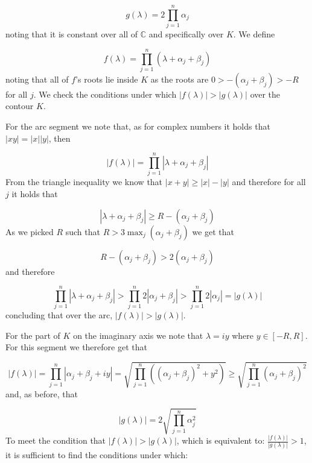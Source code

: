   \begin{equation*}
      g(\lambda)=2\prod_{j=1}^n\alpha_j
  \end{equation*}
  noting that it is constant over all of $\mathbb{C}$ and specifically over $K$.
  We define

  \begin{equation*}
      f(\lambda)=\prod_{j=1}^n(\lambda+\alpha_j+\beta_j)
  \end{equation*}
  noting that all of $f$'s roots lie inside $K$ as the roots are $0>-(\alpha_j+\beta_j)>-R$ for all $j$.
  We check the conditions under which $|f(\lambda)|>|g(\lambda)|$ over the contour $K$.

  For the arc segment we note that, as for complex numbers it holds that $|xy|=|x||y|$, then

  \begin{equation*}
      |f(\lambda)|=\prod_{j=1}^n|\lambda+\alpha_j+\beta_j|
  \end{equation*}
  From the triangle inequality we know that $|x+y| \geq |x|-|y|$ and therefore for all $j$ it holds that

  \begin{equation*}
      |\lambda+\alpha_j+\beta_j| \geq R-(\alpha_j+\beta_j)
  \end{equation*}
  As we picked $R$ such that $R>3\max_j(\alpha_j+\beta_j)$ we get that

  \begin{equation*}
      R-(\alpha_j+\beta_j)>2(\alpha_j+\beta_j)
  \end{equation*}
  and therefore

  \begin{equation*}
      \prod_{j=1}^n|\lambda+\alpha_j+\beta_j|>\prod_{j=1}^n2|\alpha_j+\beta_j|>\prod_{j=1}^n2|\alpha_j| = |g(\lambda)|
  \end{equation*}
  concluding that over the arc, $|f(\lambda)|>|g(\lambda)|$.

  For the part of $K$ on the imaginary axis we note that $\lambda=iy$ where $y\in[-R,R]$.
For this segment we therefore get that

\begin{equation*}
    |f(\lambda)|=\prod_{j=1}^n|\alpha_j+\beta_j+iy|=\sqrt{\prod_{j=1}^n((\alpha_j+\beta_j)^2+y^2)} \geq \sqrt{\prod_{j=1}^n(\alpha_j+\beta_j)^2}
 \end{equation*}
 and, as before, that

 \begin{equation*}
     |g(\lambda)|=2\sqrt{\prod_{j=1}^n\alpha_j^2}
 \end{equation*}
 To meet the condition that $|f(\lambda)|>|g(\lambda)|$, which is equivalent to: $\frac{|f(\lambda)|}{|g(\lambda)|}>1$, it is sufficient to find the conditions under which:

